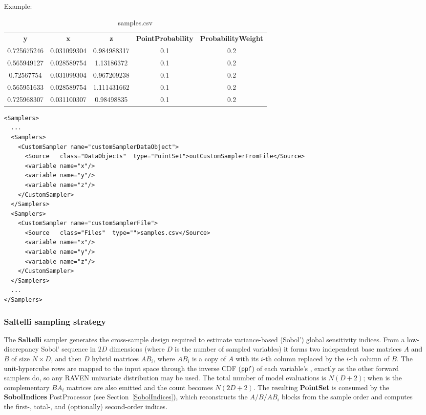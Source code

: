 Example:
\begin{table}[h!]
\centering
\caption{samples.csv}
\begin{tabular}{ccccc}
\textbf{y}  & \textbf{x}  & \textbf{z}  & \textbf{PointProbability} & \textbf{ProbabilityWeight} \\
0.725675246 & 0.031099304 & 0.984988317 & 0.1                       & 0.2                        \\
0.565949127 & 0.028589754 & 1.13186372  & 0.1                       & 0.2                        \\
0.72567754  & 0.031099304 & 0.967209238 & 0.1                       & 0.2                        \\
0.565951633 & 0.028589754 & 1.111431662 & 0.1                       & 0.2                        \\
0.725968307 & 0.031100307 & 0.98498835  & 0.1                       & 0.2
\end{tabular}
\end{table}
\begin{lstlisting}[style=XML]
<Samplers>
  ...
  <Samplers>
    <CustomSampler name="customSamplerDataObject">
      <Source   class="DataObjects"  type="PointSet">outCustomSamplerFromFile</Source>
      <variable name="x"/>
      <variable name="y"/>
      <variable name="z"/>
    </CustomSampler>
  </Samplers>
  <Samplers>
    <CustomSampler name="customSamplerFile">
      <Source   class="Files"  type="">samples.csv</Source>
      <variable name="x"/>
      <variable name="y"/>
      <variable name="z"/>
    </CustomSampler>
  </Samplers>
  ...
</Samplers>
\end{lstlisting}

\subsubsection{Saltelli sampling strategy}
\label{subsubsubsec:Saltelli}
The \textbf{Saltelli} sampler generates the cross-sample design required to
estimate variance-based (Sobol') global sensitivity indices. From a
low-discrepancy Sobol' sequence in $2D$ dimensions (where $D$ is the number of
sampled variables) it forms two independent base matrices $A$ and $B$ of size
$N \times D$, and then $D$ hybrid matrices $AB_i$, where $AB_i$ is a copy of $A$
with its $i$-th column replaced by the $i$-th column of $B$. The unit-hypercube
rows are mapped to the input space through the inverse CDF (\texttt{ppf}) of each
variable's , exactly as the other forward samplers do, so
any RAVEN univariate distribution may be used. The total number of model
evaluations is $N(D+2)$; when  is 
the complementary $BA_i$ matrices are also emitted and the count becomes
$N(2D+2)$. The resulting \textbf{PointSet} is consumed by the
\textbf{SobolIndices} PostProcessor (see Section~\ref{SobolIndices}), which
reconstructs the $A / B / AB_i$ blocks from the sample order and computes the
first-, total-, and (optionally) second-order indices.


